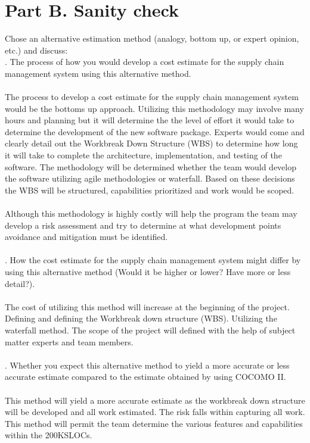 \documentclass[12pt,letterpaper]{article}
\begin{document}
\section*{Part B. Sanity check}
Chose an alternative estimation method (analogy, bottom up, or expert opinion, etc.) and discuss:\\
\quad {}.	The process of how you would develop a cost estimate for the supply chain management system using this alternative method.\\\\
\quad The process to develop a cost estimate for the supply chain management system would be the bottoms up approach. Utilizing this methodology may involve many hours and planning but it will determine the the level of effort it would take to determine the development of the new software package. Experts would come and clearly detail out the Workbreak Down Structure (WBS) to determine how long it will take to complete the architecture, implementation, and testing of the software. The methodology will be determined whether the team would develop the software utilizing agile methodologies or waterfall. Based on these decisions the WBS will be structured, capabilities prioritized and work would be scoped.\\\\
Although this methodology is highly costly will help the program the team may develop a risk assessment and try to determine at what development points avoidance and mitigation must be identified. \\\\
\quad {}.	How the cost estimate for the supply chain management system might differ by using this alternative method (Would it be higher or lower?  Have more or less detail?).\\\\
\quad The cost of utilizing this method will increase at the beginning of the project. Defining and defining the Workbreak down structure (WBS). Utilizing the waterfall method. The scope of the project will defined with the help of subject matter experts and team members. \\\\ 
\quad {}.	Whether you expect this alternative method to yield a more accurate or less accurate estimate compared to the estimate obtained by using COCOMO II. \\\\
This method will yield a more accurate estimate as the workbreak down structure will be developed and all work estimated. The risk falls within capturing all work. This method will permit the team determine the various features and capabilities within the 200KSLOCs.
\end{document}
